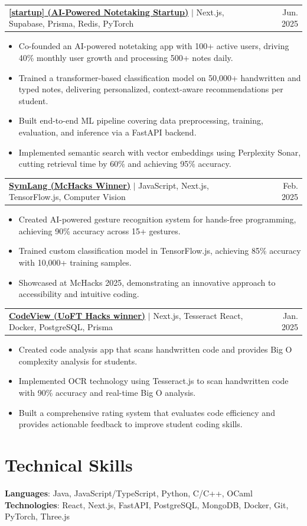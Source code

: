 \documentclass[a4,10pt]{article}
\makeatletter
\newcommand{\resumeItem}[1]{
  \item\small{
    {#1 \vspace{-2pt}}
  }
}
\newcommand{\resumeProjectHeading}[2]{
    \item
    \begin{tabular*}{0.97\textwidth}{l@{\extracolsep{\fill}}r}
      \small#1 & #2 \\
    \end{tabular*}\vspace{-7pt}
}
\newcommand{\resumeItemListStart}{\begin{itemize}}
\newcommand{\resumeItemListEnd}{\end{itemize}\vspace{-5pt}}
\makeatother
\begin{document}
\resumeProjectHeading
    {\href{https://nuclearapp.ca}{\textbf{[startup] (AI-Powered Notetaking Startup)}} $|$ Next.js, Supabase, Prisma, Redis, PyTorch}{Jun. 2025}
    \resumeItemListStart
      \resumeItem{Co-founded an AI-powered notetaking app with 100+ active users, driving 40\% monthly user growth and processing 500+ notes daily.}
      \resumeItem{Trained a transformer-based classification model on 50,000+ handwritten and typed notes, delivering personalized, context-aware recommendations per student.}
      \resumeItem{Built end-to-end ML pipeline covering data preprocessing, training, evaluation, and inference via a FastAPI backend.}
      \resumeItem{Implemented semantic search with vector embeddings using Perplexity Sonar, cutting retrieval time by 60\% and achieving 95\% accuracy.}
    \resumeItemListEnd




  \resumeProjectHeading
    {\href{https://github.com/0jas0jas/symlang}{\textbf{SymLang (McHacks Winner)}} $|$ JavaScript, Next.js, TensorFlow.js, Computer Vision}{Feb. 2025}
    \resumeItemListStart
      \resumeItem{Created AI-powered gesture recognition system for hands-free programming, achieving 90\% accuracy across 15+ gestures.}
      \resumeItem{Trained custom classification model in TensorFlow.js, achieving 85\% accuracy with 10,000+ training samples.}
      \resumeItem{Showcased at McHacks 2025, demonstrating an innovative approach to accessibility and intuitive coding.}
    \resumeItemListEnd

  \resumeProjectHeading
    {\href{https://github.com/0jas0jas/codeview}{\textbf{CodeView (UoFT Hacks winner)}} $|$ Next.js, Tesseract React, Docker, PostgreSQL, Prisma}{Jan. 2025}
    \resumeItemListStart
      \resumeItem{Created code analysis app that scans handwritten code and provides Big O complexity analysis for students.}
      \resumeItem{Implemented OCR technology using Tesseract.js to scan handwritten code with 90\% accuracy and real-time Big O analysis.}
      \resumeItem{Built a comprehensive rating system that evaluates code efficiency and provides actionable feedback to improve student coding skills.}
    \resumeItemListEnd


    
\section{Technical Skills}
\begin{itemize}[leftmargin=0.15in, label={}]
    \small{\item{
     \textbf{Languages}{: Java, JavaScript/TypeScript, Python, C/C++, OCaml} \\
     \textbf{Technologies}{: React, Next.js, FastAPI, PostgreSQL, MongoDB, Docker, Git, PyTorch, Three.js}
    }}
\end{itemize}
\end{document}
